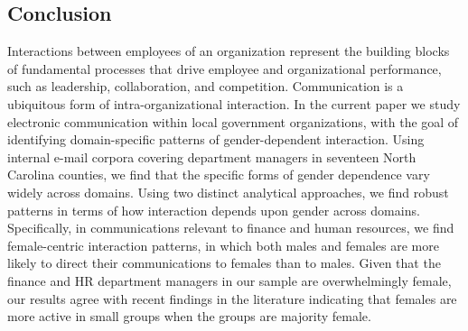 \documentclass{pnastwo}
\begin{document}
\begin{article}
\section{Conclusion}

Interactions between employees of an organization represent the building blocks of fundamental processes that drive employee and organizational performance, such as leadership, collaboration, and competition. Communication is a ubiquitous form of intra-organizational interaction. In the current paper we study electronic communication within local government organizations, with the goal of identifying domain-specific patterns of gender-dependent interaction. Using internal e-mail corpora covering department managers in seventeen North Carolina counties, we find that the specific forms of gender dependence vary widely across domains. Using two distinct analytical approaches, we find robust patterns in terms of how interaction depends upon gender across domains. Specifically, in communications relevant to finance and human resources, we find female-centric interaction patterns, in which both males and females are more likely to direct their communications to females than to males. Given that the finance and HR department managers in our sample are overwhelmingly female, our results agree with recent findings in the literature indicating that females are more active in small groups when the groups are majority female. 



\end{article}
\end{document}

